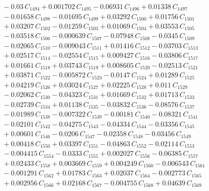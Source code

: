 \documentclass[a4paper,11pt]{article}
\begin{document}
\begin{align}
&\quad - 0.03\,C_{1494} + 0.001702\,C_{1495} - 0.06931\,C_{1496} + 0.01338\,C_{1497} \nonumber\\
&\quad - 0.01658\,C_{1498} - 0.01695\,C_{1499} + 0.03292\,C_{1500} + 0.01756\,C_{1501} \nonumber\\
&\quad + 0.03207\,C_{1502} - 0.01259\,C_{1503} + 0.01069\,C_{1504} + 0.03553\,C_{1505} \nonumber\\
&\quad - 0.03518\,C_{1506} - 0.000639\,C_{1507} - 0.07948\,C_{1508} - 0.0345\,C_{1509} \nonumber\\
&\quad - 0.02065\,C_{1510} - 0.009043\,C_{1511} + 0.01416\,C_{1512} - 0.03703\,C_{1513} \nonumber\\
&\quad + 0.02517\,C_{1514} - 0.02554\,C_{1515} + 0.009427\,C_{1516} - 0.03806\,C_{1517} \nonumber\\
&\quad + 0.01661\,C_{1518} + 0.03743\,C_{1519} + 0.008605\,C_{1520} - 0.02513\,C_{1521} \nonumber\\
&\quad + 0.03871\,C_{1522} - 0.005872\,C_{1523} - 0.0147\,C_{1524} + 0.01289\,C_{1525} \nonumber\\
&\quad + 0.04219\,C_{1526} + 0.03024\,C_{1527} + 0.02225\,C_{1528} + 0.011\,C_{1529} \nonumber\\
&\quad - 0.02062\,C_{1530} - 0.04323\,C_{1531} + 0.01669\,C_{1532} + 0.01713\,C_{1533} \nonumber\\
&\quad - 0.02739\,C_{1534} + 0.01138\,C_{1535} - 0.03832\,C_{1536} - 0.08576\,C_{1537} \nonumber\\
&\quad - 0.01989\,C_{1538} - 0.007322\,C_{1539} - 0.00181\,C_{1540} - 0.08321\,C_{1541} \nonumber\\
&\quad - 0.02101\,C_{1542} - 0.04275\,C_{1543} - 0.04334\,C_{1544} - 0.03356\,C_{1545} \nonumber\\
&\quad + 0.00601\,C_{1546} - 0.0206\,C_{1547} - 0.02358\,C_{1548} - 0.03456\,C_{1549} \nonumber\\
&\quad + 0.00418\,C_{1550} + 0.03397\,C_{1551} - 0.04863\,C_{1552} - 0.02114\,C_{1553} \nonumber\\
&\quad - 0.004415\,C_{1554} - 0.0333\,C_{1555} + 0.002027\,C_{1556} - 0.06385\,C_{1557} \nonumber\\
&\quad + 0.02433\,C_{1558} + 0.003669\,C_{1559} + 0.004249\,C_{1560} - 0.006543\,C_{1561} \nonumber\\
&\quad - 0.001291\,C_{1562} + 0.01783\,C_{1563} + 0.02037\,C_{1564} - 0.002773\,C_{1565} \nonumber\\
&\quad + 0.002956\,C_{1566} + 0.02168\,C_{1567} - 0.004755\,C_{1568} + 0.04639\,C_{1569} \nonumber\\

\end{align}
\end{document}
